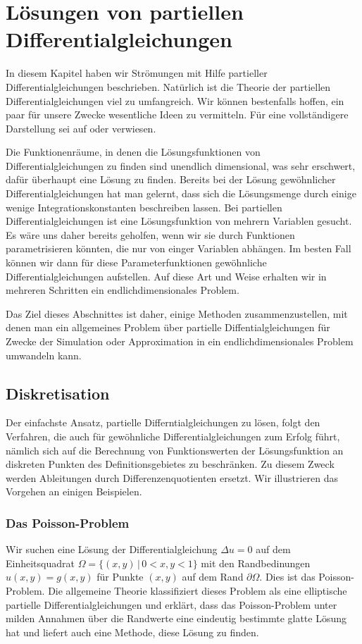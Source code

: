 %
%
%
\section{Lösungen von partiellen Differentialgleichungen}
In diesem Kapitel haben wir Strömungen mit Hilfe partieller
Differentialgleichungen beschrieben.
Natürlich ist die Theorie der partiellen Differentialgleichungen viel
zu umfangreich.
Wir können bestenfalls hoffen, ein paar für unsere Zwecke wesentliche
Ideen zu vermitteln.
Für eine vollständigere Darstellung sei auf \cite{skript:pde}
oder \cite{skript:part-diff} verwiesen.

Die Funktionenräume, in denen die Lösungsfunktionen von Differentialgleichungen
zu finden sind unendlich dimensional, was sehr erschwert,
dafür überhaupt eine Lösung zu finden.
Bereits bei der Lösung gewöhnlicher Differentialgleichungen hat man
gelernt, dass sich die Lösungsmenge durch einige wenige Integrationskonstanten
beschreiben lassen.
Bei partiellen Differentialgleichungen ist eine Lösungsfunktion von
mehrern Variablen gesucht.
Es wäre uns daher bereits geholfen, wenn wir sie durch
Funktionen parametrisieren könnten, die nur von einger Variablen
abhängen.
Im besten Fall können wir dann für diese Parameterfunktionen gewöhnliche
Differentialgleichungen aufstellen.
Auf diese Art und Weise erhalten wir in mehreren Schritten ein
endlichdimensionales Problem.

Das Ziel dieses Abschnittes ist daher, einige Methoden zusammenzustellen,
mit denen man ein allgemeines Problem über partielle Diffentialgleichungen
für Zwecke der Simulation oder Approximation
in ein endlichdimensionales Problem umwandeln kann.

\subsection{Diskretisation\label{section:diskretisation}}
Der einfachste Ansatz, partielle Differntialgleichungen zu lösen,
folgt den Verfahren, die auch für gewöhnliche Differentialgleichungen
\cite{skript:mathsem-dgl} 
zum Erfolg führt, nämlich sich auf die Berechnung von Funktionswerten
der Lösungsfunktion an diskreten Punkten des Definitionsgebietes zu
beschränken.
Zu diesem Zweck werden Ableitungen durch Differenzenquotienten ersetzt.
Wir illustrieren das Vorgehen an einigen Beispielen.

\subsubsection{Das Poisson-Problem}
Wir suchen eine Lösung der Differentialgleichung
$\Delta u = 0$ auf dem Einheitsquadrat $\Omega=\{(x,y)\,|\, 0<x,y < 1\}$
mit den Randbedinungen $u(x,y)=g(x,y)$ für Punkte $(x,y)$ auf dem
Rand $\partial\Omega$.
Dies ist das Poisson-Problem.
Die allgemeine Theorie \cite{skript:pde} klassifiziert dieses Problem
als eine elliptische partielle Differentialgleichungen und erklärt,
dass das Poisson-Problem unter milden Annahmen über die Randwerte
eine eindeutig bestimmte glatte Lösung hat und liefert auch eine Methode,
diese Lösung zu finden.

